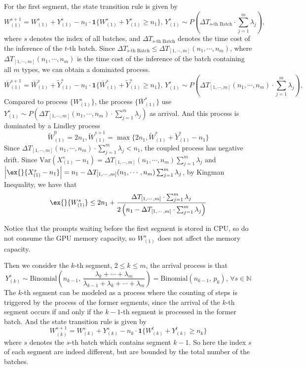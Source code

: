 \documentclass[preprint]{article}
\theoremstyle{plain}
\theoremstyle{definition}
\theoremstyle{remark}
\begin{document}
For the first segment, the state transition rule is given by
$$ W^{s+1}_{(1)} =  W^s_{(1)} + Y^s_{(1)} -n_1\cdot  \mathbf{1}\{ W^s_{(1)} + Y^s_{(1)}\geq n_1 \},\, Y^s_{(1)}\sim P(\Delta T_{ s\text{-th Batch} }\cdot \sum_{j=1}^m \lambda_j), $$
where $s$ denotes the index of all batches, and $\Delta T_{s\text{-th Batch}}$ denotes the time cost of the inference of the $t$-th batch. Since $\Delta T_{s\text{-th Batch}}\leq \Delta T_{[1,\cdots,m]}(n_1,\cdots,n_m)$, where $\Delta T_{[1,\cdots,m]}(n_1,\cdots,n_m)$ is the time cost of the inference of the batch containing all $m$ types, we can obtain a dominated process.
$$ \bar{W}^{s+1}_{(1)} =  \bar{W}^s_{(1)} + \tilde{Y}^s_{(1)} -n_1\cdot  \mathbf{1}\{ \bar{W}^s_{(1)} + \tilde{Y}^s_{(1)}\geq n_1 \},\, Y^s_{(1)}\sim P(\Delta T_{[1,\cdots,m]}(n_1,\cdots,n_m)\cdot \sum_{j=1}^m \lambda_j), $$
Compared to process $\{W^s_{(1)}\}$, the process $\{ \bar{W}^s_{(1)} \}$ use $Y^s_{(1)}\sim P(\Delta T_{[1,\cdots,m]}(n_1,\cdots,n_m)\cdot \sum_{j=1}^m \lambda_j)$ as arrival. And this process is dominated by a Lindley process
$$\tilde{W}^0_{(1)}=2n_1,  \tilde{W}^{s+1}_{(1)}=\max\{2n_1, \tilde{W}^s_{(1)}+\tilde{Y}^s_{(1)}-n_1\}$$
Since $\Delta T_{[1,\cdots,m]}(n_1,\cdots,n_m)\cdot \sum_{j=1}^m \lambda_j<n_1$, the coupled process has negative drift.
Since $\text{Var}(X^s_{(1)} - n_1) = \Delta T_{[1,\cdots,m]}(n_1,\cdots,n_m)\sum_{j=1}^m \lambda_j$ and $\left|\ex{}{X^s_{(1)} - n_1}\right| = n_1 -\Delta T_{[1,\cdots,m]}(n_1,\cdots,n_m)\sum_{j=1}^m \lambda_j$, by Kingman Inequality, we have that
$$\ex{}{W^s_{(1)}}\leq 2n_1 + \frac{\Delta T_{ [1,\cdots,m] }\cdot \sum_{j=1}^m \lambda_j}{2\left( n_1 - \Delta T_{ [1,\cdots,m] }\cdot \sum_{j=1}^m \lambda_j\right)} $$

Notice that the prompts waiting before the first segment is stored in CPU, so do not consume the GPU memory capacity, so $W^s_{(1)}$ does not affect the memory capacity.

Then we consider the $k$-th segment, $2\leq k\leq m$, the arrival process is that 
$$Y^s_{(k)} \sim \text{Binomial}\left(  n_{k-1} ,\, \frac{\lambda_{k}+\cdots+\lambda_m }{\lambda_{k-1}+\lambda_k+\cdots+\lambda_m} \right) = \text{Binomial}( n_{k-1} ,\, p_k),\,\forall s\in \mathbb{N} $$
The $k$-th segment can be modeled as a process where the counting of steps is triggered by the process of the former segments, since the arrival of the $k$-th segment occurs if and only if the $k-1$-th segment is processed in the former batch. And the state transition rule is given by
$$W^{s+1}_{(k)}=W^{s}_{(k)}+Y^s_{(k)} - n_{k}\cdot \mathbf{1}\{ W^{t}_{(k)}+Y^t_{(k)}\geq n_{k}  \}$$
where $s$ denotes the $s$-th batch which contains segment $k-1$. So here the index $s$ of each segment are indeed different, but are bounded by the total number of the batches.
\end{document}
